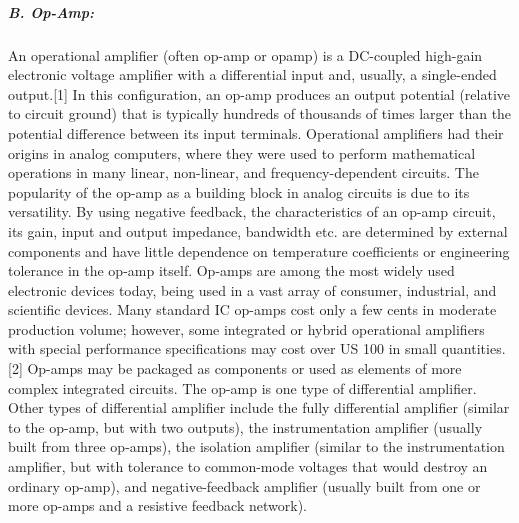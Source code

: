 \subparagraph{B. Op-Amp: }
An operational amplifier (often op-amp or opamp) is a DC-coupled high-gain electronic 
voltage amplifier with a differential input and, usually, a single-ended output.[1] In 
this configuration, an op-amp produces an output potential (relative to circuit ground) 
that is typically hundreds of thousands of times larger than the potential difference 
between its input terminals. Operational amplifiers had their origins in analog computers, 
where they were used to perform mathematical operations in many linear, non-linear, and 
frequency-dependent circuits.
The popularity of the op-amp as a building block in analog circuits is due to its 
versatility. By using negative feedback, the characteristics of an op-amp circuit, its 
gain, input and output impedance, bandwidth etc. are determined by external components 
and have little dependence on temperature coefficients or engineering tolerance in the 
op-amp itself.
Op-amps are among the most widely used electronic devices today, being used in a vast 
array of consumer, industrial, and scientific devices. Many standard IC op-amps cost 
only a few cents in moderate production volume; however, some integrated or hybrid 
operational amplifiers with special performance specifications may cost over US 100 in 
small quantities.[2] Op-amps may be packaged as components or used as elements of more 
complex integrated circuits.
The op-amp is one type of differential amplifier. Other types of differential amplifier 
include the fully differential amplifier (similar to the op-amp, but with two outputs), 
the instrumentation amplifier (usually built from three op-amps), the isolation amplifier 
(similar to the instrumentation amplifier, but with tolerance to common-mode voltages 
that would destroy an ordinary op-amp), and negative-feedback amplifier (usually built 
from one or more op-amps and a resistive feedback network).

